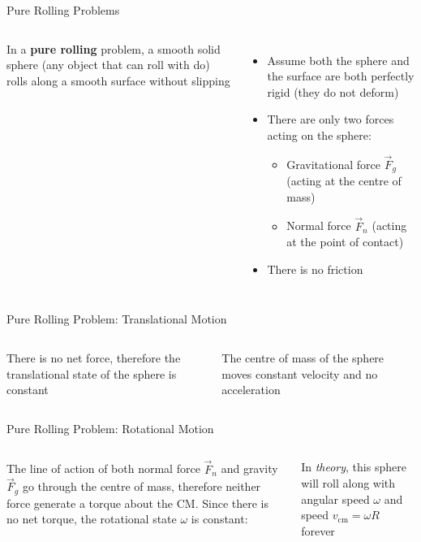 \documentclass[12pt,compress,aspectratio=169]{beamer}
\begin{document}
\begin{frame}{Pure Rolling Problems}
  \begin{columns}[T]
    

    In a \textbf{pure rolling} problem, a smooth solid sphere (any object that
    can roll with do) rolls along a smooth surface without slipping
    \begin{itemize}
    \item Assume both the sphere and the surface are both perfectly rigid
      (they do not deform)
    \item There are only two forces acting on the sphere:
      \begin{itemize}
      \item Gravitational force $\vec F_g$ (acting at the centre of mass)
      \item Normal force $\vec F_n$ (acting at the point of contact)
      \end{itemize}
    \item There is no friction
    \end{itemize}
  \end{columns}
\end{frame}



\begin{frame}{Pure Rolling Problem: Translational Motion}
  \begin{columns}
    There is no net force, therefore the translational state
    of the sphere is constant


    The centre of mass of the sphere moves constant velocity and no acceleration
    
  \end{columns}
\end{frame}




\begin{frame}{Pure Rolling Problem: Rotational Motion}
  \begin{columns}
    The line of action of both normal force $\vec F_n$ and gravity $\vec F_g$
    go through the centre of mass, therefore neither force generate a torque
    about the CM. Since there is no net torque, the rotational state $\omega$
    is constant:
    

    In \emph{theory}, this sphere will roll along with angular speed $\omega$
    and speed $v_\text{cm}=\omega R$ forever

    
  \end{columns}
\end{frame}
\end{document}
